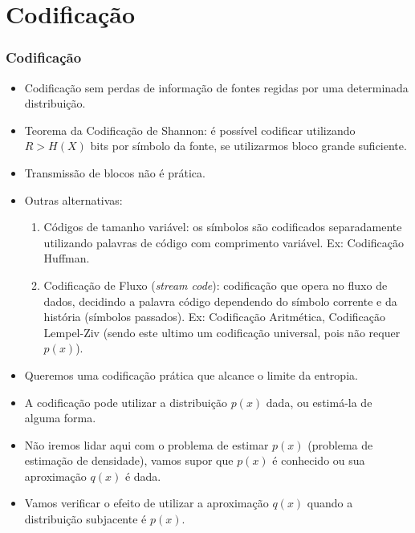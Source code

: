 \section{Codificação}

\begin{frame}[allowframebreaks]
  \frametitle{Codificação}
  \begin{itemize}
  \item Codificação sem perdas de informação de fontes regidas por uma determinada distribuição.
  \item Teorema da Codificação de Shannon: é possível codificar utilizando $R > H(X)$ bits por
	símbolo da fonte, se utilizarmos bloco grande suficiente.
  \item Transmissão de blocos não é prática.
  \item Outras alternativas:
	\begin{enumerate}
	\item Códigos de tamanho variável: os símbolos são codificados separadamente utilizando
		palavras de código com comprimento variável. Ex: Codificação Huffman.
	\item Codificação de Fluxo (\textit{stream code}): codificação que opera no fluxo de dados,
		decidindo a palavra código dependendo do símbolo corrente e da história 
		(símbolos passados). Ex: Codificação Aritmética, Codificação Lempel-Ziv
		(sendo este ultimo um codificação universal, pois não requer $p(x)$).
	\end{enumerate}
  \item Queremos uma codificação prática que alcance o limite da entropia.
  \item A codificação pode utilizar a distribuição $p(x)$ dada, ou estimá-la de alguma forma.
  \item Não iremos lidar aqui com o problema de estimar $p(x)$ (problema de estimação de densidade),
	vamos supor que $p(x)$ é conhecido ou sua aproximação $q(x)$ é dada.
  \item Vamos verificar o efeito de utilizar a aproximação $q(x)$ quando a distribuição subjacente é $p(x)$.
  \end{itemize}
\end{frame}

